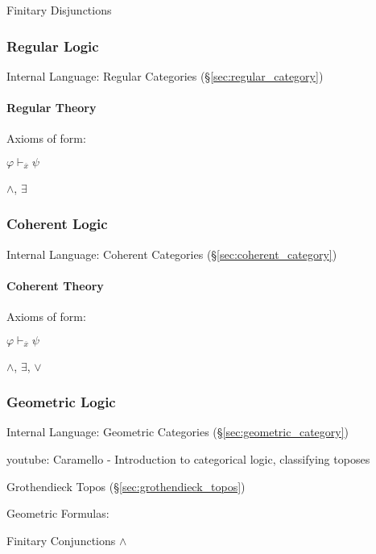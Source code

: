 Finitary Disjunctions



\subsubsection{Regular Logic}\label{sec:regular_logic}

Internal Language: Regular Categories (\S\ref{sec:regular_category})



\paragraph{Regular Theory}\label{sec:regular_theory}\hfill

Axioms of form:

$\varphi \vdash_{\overline{x}} \psi$

$\wedge$, $\exists$



\subsubsection{Coherent Logic}\label{sec:coherent_logic}

Internal Language: Coherent Categories (\S\ref{sec:coherent_category})



\paragraph{Coherent Theory}\label{sec:coherent_theory}\hfill

Axioms of form:

$\varphi \vdash_{\overline{x}} \psi$

$\wedge$, $\exists$, $\vee$



\subsubsection{Geometric Logic}\label{sec:geometric_logic}

Internal Language: Geometric Categories
(\S\ref{sec:geometric_category})


youtube: Caramello - Introduction to categorical logic, classifying
toposes

Grothendieck Topos (\S\ref{sec:grothendieck_topos})

Geometric Formulas:

Finitary Conjunctions $\wedge$

